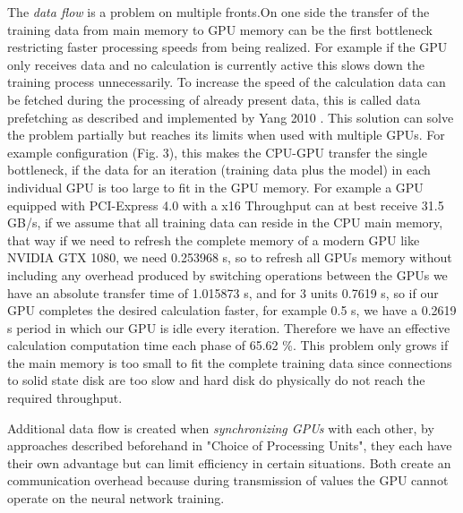 \documentclass[conference]{IEEEtran}
\begin{document}
The \emph{data flow} is a problem on multiple fronts.On one side the transfer of the training data from main memory to GPU memory can be the first bottleneck restricting faster processing speeds from being realized. For example if the GPU only receives data and no calculation is currently active this slows down the training process unnecessarily. To increase the speed of the calculation data can be fetched during the processing of already present data, this is called data prefetching as described and implemented by Yang 2010 \cite{yang2010gpgpu}. This solution can solve the problem partially but reaches its limits when used with multiple GPUs. For example configuration (Fig. 3), this makes the CPU-GPU transfer the single bottleneck, if the data for an iteration (training data plus the model) in each individual GPU is too large to fit in the GPU memory. For example a GPU equipped with PCI-Express 4.0 with a x16 Throughput can at best receive 31.5 GB/s, if we assume that all training data can reside in the CPU main memory, that way if we need to refresh the complete memory of a modern GPU like NVIDIA GTX 1080, we need 0.253968 s, so to refresh all GPUs memory without including any overhead produced by switching operations between the GPUs we have an absolute transfer time of 1.015873 s, and for 3 units 0.7619 s, so if our GPU completes the desired calculation faster, for example 0.5 s, we have a 0.2619 s period in which our GPU is idle every iteration. Therefore we have an effective calculation computation time each phase of 65.62 \%. This problem only grows if the main memory is too small to fit the complete training data since connections to solid state disk are too slow and hard disk do physically do not reach the required throughput.

Additional data flow is created when \emph{synchronizing GPUs} with each other, by approaches described beforehand in "Choice of Processing Units", they each have their own advantage but can limit efficiency in certain situations. Both create an communication overhead because during transmission of values the GPU cannot operate on the neural network training.
\end{document}
